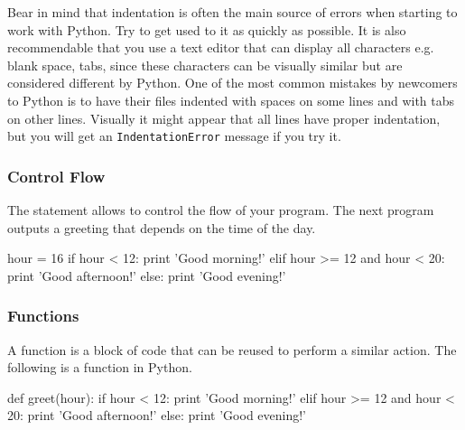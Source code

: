 \noindent Bear in mind that indentation is often the main source of errors when starting to work with Python. Try to get used to it as quickly as possible. It is also recommendable that you use a text editor that can display all characters e.g. blank space, tabs, since these characters can be visually similar but are considered different by Python. One of the most common mistakes by newcomers to Python is to have their files indented with spaces on some lines and with tabs on other lines. Visually it might appear that all lines have proper indentation, but you will get an \texttt{IndentationError} message if you try it.



\subsubsection{Control Flow}

The  statement allows to control the flow of your program. The next program outputs a greeting that depends on the time of the day.

\begin{python}
hour = 16
if hour < 12:
    print 'Good morning!'
elif hour >= 12 and hour < 20:
    print 'Good afternoon!'
else:
    print 'Good evening!'
\end{python}

 
\subsubsection{Functions}

A function is a block of code that can be reused to perform a similar action. The following is a function in Python. 

\begin{python}
def greet(hour):
    if hour < 12:
        print 'Good morning!'
    elif hour >= 12 and hour < 20:
        print 'Good afternoon!'
    else:
        print 'Good evening!'
\end{python}

